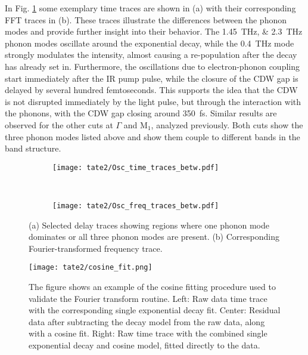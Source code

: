 In Fig. \ref{fig:TaTe_FFT_traces_betw} some exemplary time traces are shown in (a) with their corresponding FFT traces in (b).
These traces illustrate the differences between the phonon modes and provide further insight into their behavior.
The \qtylist{1.45; 2.3}{\tera\hertz} phonon modes oscillate around the exponential decay, while the \qty{0.4}{\tera\hertz} mode strongly modulates the intensity, almost causing a re-population after the decay has already set in.
Furthermore, the oscillations due to electron-phonon coupling start immediately after the IR pump pulse, while the closure of the CDW gap is delayed by several hundred femtoseconds.
This supports the idea that the CDW is not disrupted immediately by the light pulse, but through the interaction with the phonons, with the CDW gap closing around \qty{350}{\femto\second}.
Similar results are observed for the other cuts at $\Gamma$ and M$_1$, analyzed previously.
Both cuts show the three phonon modes listed above and show them couple to different bands in the band structure.

\begin{figure}[t!]
	\centering
	\begin{subfigure}[b]{\textwidth}
		\texttt{[image: tate2/Osc\_time\_traces\_betw.pdf]}
		\caption{}
	\end{subfigure}
	\\
	\begin{subfigure}[b]{\textwidth}
		\texttt{[image: tate2/Osc\_freq\_traces\_betw.pdf]}
		\caption{}
	\end{subfigure}
	\caption{(a) Selected delay traces showing regions where one phonon mode dominates or all three phonon modes are present. (b) Corresponding Fourier-transformed frequency trace.}
	\label{fig:TaTe_FFT_traces_betw}
\end{figure}

\begin{figure}[b!]
	\centering
	\texttt{[image: tate2/cosine\_fit.png]}
	\caption{The figure shows an example of the cosine fitting procedure used to validate the Fourier transform routine. Left: Raw data time trace with the corresponding single exponential decay fit. Center: Residual data after subtracting the decay model from the raw data, along with a cosine fit. Right: Raw time trace with the combined single exponential decay and cosine model, fitted directly to the data.}
	\label{fig:TaTe_cosine}
\end{figure}

